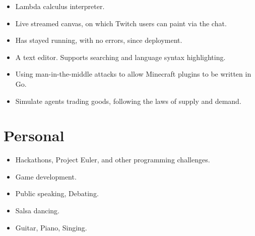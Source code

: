 \documentclass{jcgcv}
\begin{document}
\begin{column}
\begin{itemize}
  \item Lambda calculus interpreter.
\end{itemize}

\begin{itemize}
  \item Live streamed canvas, on which Twitch users can paint via the chat.
  \item Has stayed running, with no errors, since deployment.
\end{itemize}

\begin{itemize}
  \item A text editor. Supports searching and language syntax highlighting.
\end{itemize}

\begin{itemize}
  \item Using man-in-the-middle attacks to allow Minecraft plugins to be
        written in Go.
\end{itemize}

\begin{itemize}
  \item Simulate agents trading goods, following the laws of supply and demand.
\end{itemize}



\section{Personal}

\begin{itemize}
  \item Hackathons, Project Euler, and other programming challenges.
  \item Game development.
  \item Public speaking, Debating.
  \item Salsa dancing.
  \item Guitar, Piano, Singing.
\end{itemize}



\end{column}
\end{document}
